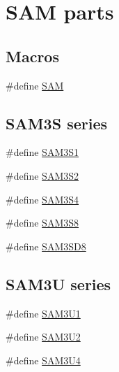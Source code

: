 \hypertarget{group__sam__part__macros__group}{}\section{S\+AM parts}
\label{group__sam__part__macros__group}
\subsection*{Macros}
\begin{DoxyCompactItemize}
\item 
\#define \mbox{\hyperlink{group__sam__part__macros__group_ga0184d5fd98854f0e40eef3a27de91fed}{S\+AM}}
\end{DoxyCompactItemize}
\subsection*{S\+A\+M3S series}
\begin{DoxyCompactItemize}
\item 
\#define \mbox{\hyperlink{group__sam__part__macros__group_gac1f138c6fe48b20faa71fb2d68d68b52}{S\+A\+M3\+S1}}
\item 
\#define \mbox{\hyperlink{group__sam__part__macros__group_ga3665c1cc7fa5ad33231fde9e16b562cd}{S\+A\+M3\+S2}}
\item 
\#define \mbox{\hyperlink{group__sam__part__macros__group_gae92413f616568bd2f38622e20f4925e0}{S\+A\+M3\+S4}}
\item 
\#define \mbox{\hyperlink{group__sam__part__macros__group_gaea8f1cca303520385d12110ad8e8bafe}{S\+A\+M3\+S8}}
\item 
\#define \mbox{\hyperlink{group__sam__part__macros__group_ga9f16069247b2e38ddb0bcaa912750a4f}{S\+A\+M3\+S\+D8}}
\end{DoxyCompactItemize}
\subsection*{S\+A\+M3U series}
\begin{DoxyCompactItemize}
\item 
\#define \mbox{\hyperlink{group__sam__part__macros__group_gae39c5d03b1af93b2864e5f72908a0ff3}{S\+A\+M3\+U1}}
\item 
\#define \mbox{\hyperlink{group__sam__part__macros__group_ga0feb884f39921517436f269c86914cb0}{S\+A\+M3\+U2}}
\item 
\#define \mbox{\hyperlink{group__sam__part__macros__group_ga2af1cda107cbae1f393bce7a6c659a98}{S\+A\+M3\+U4}}
\end{DoxyCompactItemize}
